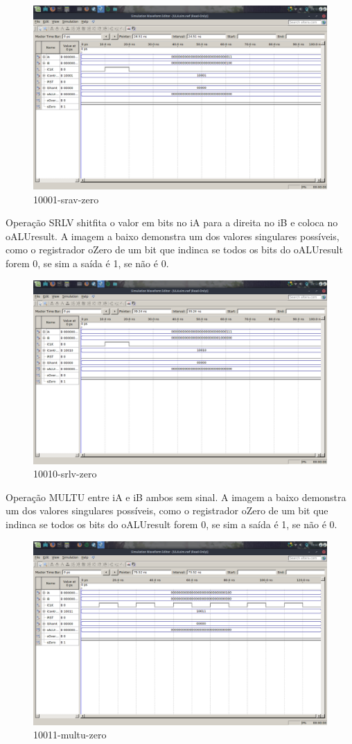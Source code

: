 \documentclass[12pt]{article}
\begin{document}
\begin{figure}[H]
	\centering
	\includegraphics[width=.8\textwidth]{10001-srav-zero.png}
	\caption{10001-srav-zero}
	\label{fig:10001-srav-zero}
\end{figure}
Operação SRLV shitfita o valor em bits no iA para a direita no iB e coloca no oALUresult. 
A imagem a baixo demonstra um dos valores singulares possíveis, como o registrador oZero de um bit que indinca se todos os bits do oALUresult forem 0, se sim a saída é 1, se não é 0.
\begin{figure}[H]
	\centering
	\includegraphics[width=.8\textwidth]{10010-srlv-zero.png}
	\caption{10010-srlv-zero}
	\label{fig:10010-srlv-zero}
\end{figure}
Operação MULTU entre iA e iB ambos sem sinal.
A imagem a baixo demonstra um dos valores singulares possíveis, como o registrador oZero de um bit que indinca se todos os bits do oALUresult forem 0, se sim a saída é 1, se não é 0.
\begin{figure}[H]
	\centering
	\includegraphics[width=.8\textwidth]{10011-multu-zero.png}
	\caption{10011-multu-zero}
	\label{fig:10011-multu-zero}
\end{figure}
\end{document}
